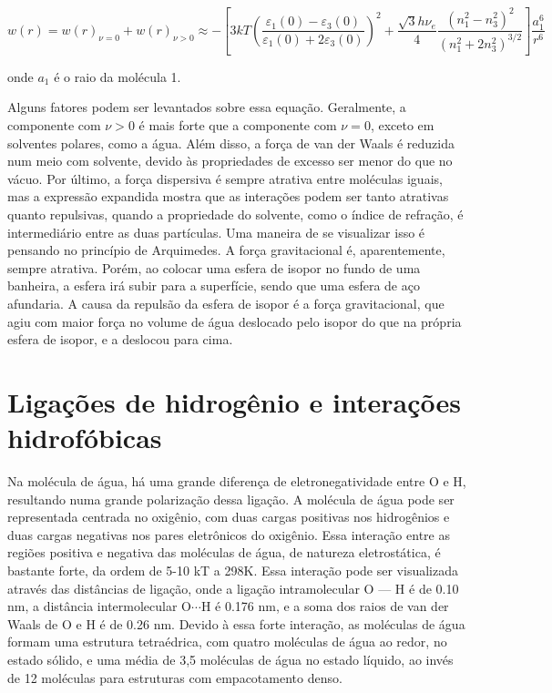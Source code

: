 	\begin{equation}
		w ( r ) = w ( r ) _ { \nu = 0 } + w ( r ) _ { \nu > 0 } \approx - \left[ 3 k T \left( \frac { \varepsilon _ { 1 } ( 0 ) - \varepsilon _ { 3 } ( 0 ) } { \varepsilon _ { 1 } ( 0 ) + 2 \varepsilon _ { 3 } ( 0 ) } \right) ^ { 2 } + \frac { \sqrt { 3 } h \nu _ { e } } { 4 } \frac { \left( n _ { 1 } ^ { 2 } - n _ { 3 } ^ { 2 } \right) ^ { 2 } } { \left( n _ { 1 } ^ { 2 } + 2 n _ { 3 } ^ { 2 } \right) ^ { 3 / 2 } } \right] \frac { a _ { 1 } ^ { 6 } } { r ^ { 6 } }
		\label{eqn:energia_maclachlan}
	\end{equation} 
	
	\noindent onde \(a_1\) é o raio da molécula 1.
	
	Alguns fatores podem ser levantados sobre essa equação. Geralmente, a componente com \(\nu > 0\) é mais forte que a componente com \(\nu = 0\), exceto em solventes polares, como a água. Além disso, a força de van der Waals é reduzida num meio com solvente, devido às propriedades de excesso ser menor do que no vácuo. Por último, a força dispersiva é sempre atrativa entre moléculas iguais, mas a expressão expandida mostra que as interações podem ser tanto atrativas quanto repulsivas, quando a propriedade do solvente, como o índice de refração, é intermediário entre as duas partículas. Uma maneira de se visualizar isso é pensando no princípio de Arquimedes. A força gravitacional é, aparentemente, sempre atrativa. Porém, ao colocar uma esfera de isopor no fundo de uma banheira, a esfera irá subir para a superfície, sendo que uma esfera de aço afundaria. A causa da repulsão da esfera de isopor é a força gravitacional, que agiu com maior força no volume de água deslocado pelo isopor do que na própria esfera de isopor, e a deslocou para cima. 
	
	\section{Ligações de hidrogênio e interações hidrofóbicas}  
	
	Na molécula de água, há uma grande diferença de eletronegatividade entre O e H, resultando numa grande polarização dessa ligação. A molécula de água pode ser representada centrada no oxigênio, com duas cargas positivas nos hidrogênios e duas cargas negativas nos pares eletrônicos do oxigênio. Essa interação entre as regiões positiva e negativa das moléculas de água, de natureza eletrostática, é bastante forte, da ordem de 5-10 kT a 298K. Essa interação pode ser visualizada através das distâncias de ligação, onde a ligação intramolecular O --- H é de 0.10 nm, a distância intermolecular \(\mathrm{O} \cdots \mathrm{H}\) é 0.176 nm, e a soma dos raios de van der Waals de O e H é de 0.26 nm. Devido à essa forte interação, as moléculas de água formam uma estrutura tetraédrica, com quatro moléculas de água ao redor, no estado sólido, e uma média de 3,5 moléculas de água no estado líquido, ao invés de 12 moléculas para estruturas com empacotamento denso.
	
